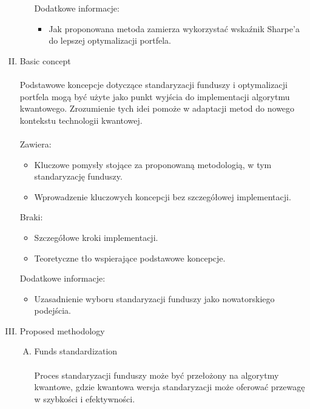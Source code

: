 \documentclass[polish,envcountsect,10pt]{article}
\begin{document}
\begin{enumerate}[I.]
\begin{enumerate}[A.]
\begin{itemize}
                \end{itemize}
            Dodatkowe informacje:
                \begin{itemize}
                  \item Jak proponowana metoda zamierza wykorzystać wskaźnik Sharpe’a do lepszej optymalizacji portfela.
                \end{itemize}
        \end{enumerate}
    \item  Basic concept
        \\
        \\
        Podstawowe koncepcje dotyczące standaryzacji funduszy i optymalizacji portfela mogą być użyte jako punkt wyjścia do implementacji algorytmu kwantowego. Zrozumienie tych idei pomoże w adaptacji metod do nowego kontekstu technologii kwantowej.
        \\
        \\
        Zawiera:
            \begin{itemize}
              \item Kluczowe pomysły stojące za proponowaną metodologią, w tym standaryzację funduszy.
              \item Wprowadzenie kluczowych koncepcji bez szczegółowej implementacji.
            \end{itemize}
        Braki:
            \begin{itemize}
              \item Szczegółowe kroki implementacji.
              \item Teoretyczne tło wspierające podstawowe koncepcje.
            \end{itemize}
        Dodatkowe informacje:
            \begin{itemize}
              \item Uzasadnienie wyboru standaryzacji funduszy jako nowatorskiego podejścia.
            \end{itemize}
    \item  Proposed methodology
        \begin{enumerate}[A.]
          \item Funds standardization
                \\
                \\
                Proces standaryzacji funduszy może być przełożony na algorytmy kwantowe, gdzie kwantowa wersja standaryzacji może oferować przewagę w szybkości i efektywności.
                \\

\end{enumerate}
\end{enumerate}
\end{document}
